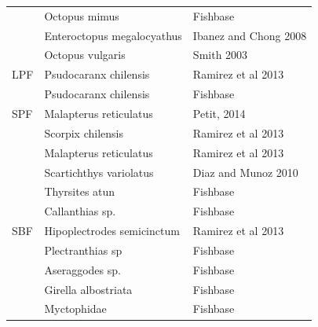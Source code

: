 \documentclass[11pt]{article}
\begin{document}
\begin{center}
\begin{tabular}{lll}
      &  Octopus mimus               &  Fishbase                                                                        \\
      &  Enteroctopus megalocyathus  &  Ibanez and Chong 2008                                                           \\
      &  Octopus vulgaris            &  Smith 2003                                                                      \\
\hline
 LPF  &  Psudocaranx chilensis       &  Ramirez et al 2013                                                              \\
      &  Psudocaranx chilensis       &  Fishbase                                                                        \\
\hline
 SPF  &  Malapterus reticulatus      &  Petit, 2014                                                                     \\
      &  Scorpix chilensis           &  Ramirez et al 2013                                                              \\
      &  Malapterus reticulatus      &  Ramirez et al 2013                                                              \\
      &  Scartichthys variolatus     &  Diaz and Munoz 2010                                                             \\
      &  Thyrsites atun              &  Fishbase                                                                        \\
      &  Callanthias sp.             &  Fishbase                                                                        \\
\hline
 SBF  &  Hipoplectrodes semicinctum  &  Ramirez et al 2013                                                              \\
      &  Plectranthias sp            &  Fishbase                                                                        \\
      &  Aseraggodes sp.             &  Fishbase                                                                        \\
      &  Girella albostriata         &  Fishbase                                                                        \\
      &  Myctophidae                 &  Fishbase                                                                        \\

\end{tabular}
\end{center}
\end{document}
